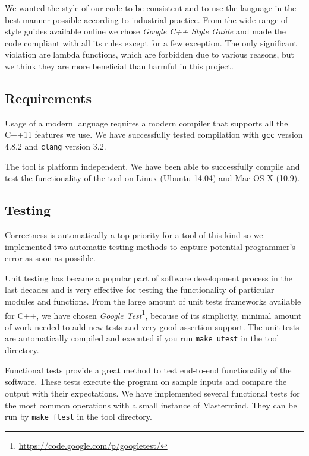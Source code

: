 We wanted the style of our code to be consistent and to use
  the language in the best manner possible according to industrial practice.
From the wide range of style guides available online
 we chose \emph{Google C++ Style Guide}\cite{googlestyle} and made
 the code compliant with all its rules except for a few exception.
The only significant violation are lambda functions, which are forbidden
due to various reasons,
 but we think they are more beneficial than harmful in this project.

\subsection{Requirements}

Usage of a modern language requires a modern compiler
  that supports all the C++11 features we use.
We have successfully tested compilation with
 \texttt{gcc} version $4.8.2$ and
 \texttt{clang} version $3.2$.

The tool is platform independent.
We have been able to successfully compile and test the functionality of the tool
  on Linux (Ubuntu 14.04) and Mac OS X (10.9).

\subsection{Testing}
Correctness is automatically a top priority for a tool of this kind so
  we implemented two automatic testing methods to
  capture potential programmer's error as soon as possible.

Unit testing has became a popular part of software development process
  in the last decades and is very effective for testing the functionality
  of particular modules and functions.
From the large amount of unit tests frameworks available for C++,
  we have chosen \emph{Google Test}\footnote{\url{https://code.google.com/p/googletest/}},
  because of its simplicity, minimal amount of work needed to add new tests
  and very good assertion support.
The unit tests are automatically compiled and executed if you run \texttt{make utest}
  in the tool directory.

Functional tests provide a great method to test end-to-end functionality
  of the software.
These tests execute the program on sample inputs and compare the output
  with their expectations.
We have implemented several functional tests for the most common
  operations with a small instance of Mastermind.
They can be run by \texttt{make ftest} in the tool directory.

